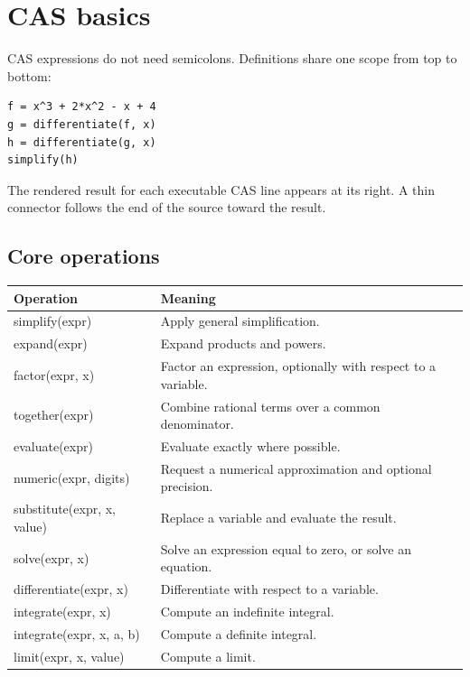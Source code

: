 \documentclass[11pt,a4paper]{article}
\begin{document}
\section{CAS basics}

CAS expressions do not need semicolons. Definitions share one scope from top to bottom:

\begin{lstlisting}[style=jessie]
f = x^3 + 2*x^2 - x + 4
g = differentiate(f, x)
h = differentiate(g, x)
simplify(h)
\end{lstlisting}

The rendered result for each executable CAS line appears at its right. A thin connector follows the end of the source toward the result.

\subsection{Core operations}

\begin{tabularx}{\textwidth}{@{}>{\ttfamily}l X@{}}
\toprule
\normalfont\textbf{Operation} & \textbf{Meaning} \\
\midrule
simplify(expr) & Apply general simplification. \\
expand(expr) & Expand products and powers. \\
factor(expr, x) & Factor an expression, optionally with respect to a variable. \\
together(expr) & Combine rational terms over a common denominator. \\
evaluate(expr) & Evaluate exactly where possible. \\
numeric(expr, digits) & Request a numerical approximation and optional precision. \\
substitute(expr, x, value) & Replace a variable and evaluate the result. \\
solve(expr, x) & Solve an expression equal to zero, or solve an equation. \\
differentiate(expr, x) & Differentiate with respect to a variable. \\
integrate(expr, x) & Compute an indefinite integral. \\
integrate(expr, x, a, b) & Compute a definite integral. \\
limit(expr, x, value) & Compute a limit. \\
\bottomrule
\end{tabularx}
\end{document}
